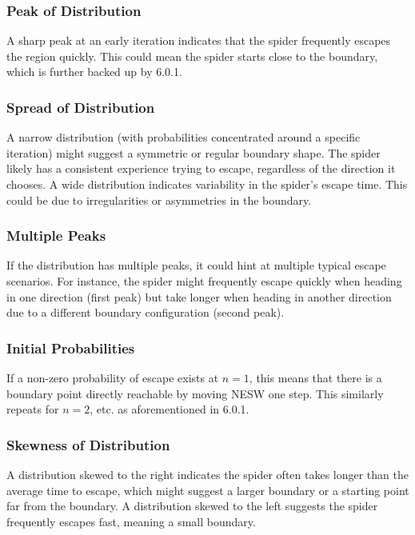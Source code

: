 \documentclass[12pt,a4paper]{article}
\begin{document}
\subsubsection{Peak of Distribution}

A sharp peak at an early iteration indicates that the spider frequently escapes the region quickly. This could mean the spider starts close to the boundary, which is further backed up by 6.0.1.

\subsubsection{Spread of Distribution}

A narrow distribution (with probabilities concentrated around a specific iteration) might suggest a symmetric or regular boundary shape. The spider likely has a consistent experience trying to escape, regardless of the direction it chooses.
A wide distribution indicates variability in the spider's escape time. This could be due to irregularities or asymmetries in the boundary.

\subsubsection{Multiple Peaks}

    If the distribution has multiple peaks, it could hint at multiple typical escape scenarios. For instance, the spider might frequently escape quickly when heading in one direction (first peak) but take longer when heading in another direction due to a different boundary configuration (second peak).

\subsubsection{Initial Probabilities}
If a non-zero probability of escape exists at \(n=1\), this means that there is a boundary point directly reachable by moving NESW one step. This similarly repeats for \(n=2\), etc. as aforementioned in 6.0.1.

\subsubsection{Skewness of Distribution}

A distribution skewed to the right indicates the spider often takes longer than the average time to escape, which might suggest a larger boundary or a starting point far from the boundary.
A distribution skewed to the left suggests the spider frequently escapes fast, meaning a small boundary.
\end{document}
